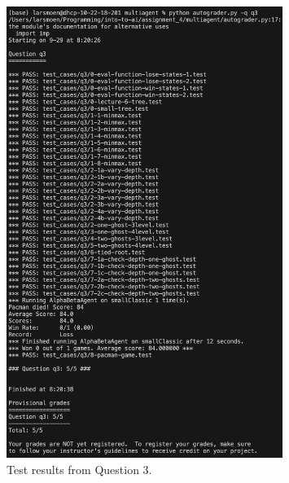 \begin{figure}[h!]
    \centering
    \includegraphics[width=0.8\textwidth]{"../Images/q3_result.png"}
    \caption{Test results from Question 3.}
\end{figure}